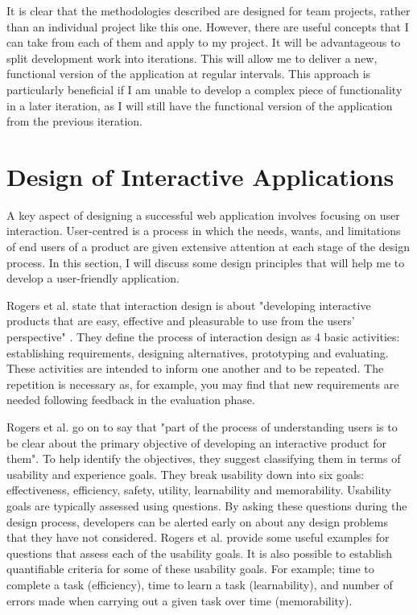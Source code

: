 \documentclass[authoryearcitations]{UoYCSproject}
\begin{document}
It is clear that the methodologies described are designed for team projects, rather than an individual project like this one. However, there are useful concepts that I can take from each of them and apply to my project. It will be advantageous to split development work into iterations. This will allow me to deliver a new, functional version of the application at regular intervals. This approach is particularly beneficial if I am unable to develop a complex piece of functionality in a later iteration, as I will still have the functional version of the application from the previous iteration. 


\section{Design of Interactive Applications}

A key aspect of designing a successful web application involves focusing on user interaction. User-centred is a process in which the needs, wants, and limitations of end users of a product are given extensive attention at each stage of the design process. In this section, I will discuss some design principles that will help me to develop a user-friendly application. 

Rogers et al. state that interaction design is about "developing interactive products that are easy, effective and pleasurable to use from the users' perspective" \citep{Rogers2011}. They define the process of interaction design as 4 basic activities: establishing requirements, designing alternatives, prototyping and evaluating. These activities are intended to inform one another and to be repeated. The repetition is necessary as, for example, you may find that new requirements are needed following feedback in the evaluation phase.

Rogers et al. go on to say that "part of the process of understanding users is to be clear about the primary objective of  developing an interactive product for them". To help identify the objectives, they suggest classifying them in terms of usability and experience goals. They break usability down into six goals: effectiveness, efficiency, safety, utility, learnability and memorability. Usability goals are typically assessed using questions. By asking these questions during the design process, developers can be alerted early on about any design problems that they have not considered. Rogers et al. provide some useful examples for questions that assess each of the usability goals. It is also possible to establish quantifiable criteria for some of these usability goals. For example; time to complete a task (efficiency), time to learn a task (learnability), and number of errors made when carrying out a given task over time (memorability). 
\end{document}
